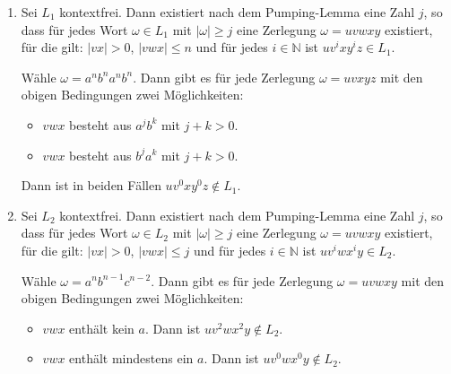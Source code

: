 \documentclass{bschlangaul-aufgabe}
\begin{document}
\begin{enumerate}


\item {}

\begin{bAntwort}
Sei $L_1$ kontextfrei. Dann existiert nach dem Pumping-Lemma eine Zahl
$j$, so dass für jedes Wort $\omega \in L_1$ mit $|\omega| \geq j$ eine
Zerlegung $\omega = uvwxy$ existiert, für die gilt: $|vx| > 0$, $|vwx|
\leq n$ und für jedes $i \in \mathbb{N}$ ist $u v^i x y^i z \in L_1$.

Wähle $\omega = a^n b^n a^n b^n$. Dann gibt es für jede Zerlegung
$\omega = uvxyz$ mit den obigen Bedingungen zwei Möglichkeiten:

\begin{itemize}
\item $vwx$ besteht aus $a^j b^k$ mit $j + k > 0$.

\item $vwx$ besteht aus $b^j a^k$ mit $j + k > 0$.
\end{itemize}
Dann ist in beiden Fällen $u v^0 x y^0 z \notin L_1$.
\end{bAntwort}


\item {}

\begin{bAntwort}
Sei $L_2$ kontextfrei. Dann existiert nach dem Pumping-Lemma eine Zahl
$j$, so dass für jedes Wort $\omega \in L_2$ mit $|\omega| \geq j$ eine
Zerlegung $\omega = uvwxy$ existiert, für die gilt: $|vx| > 0$, $|vwx|
\leq j$ und für jedes $i \in \mathbb{N}$ ist $u v^i w x^i y \in L_2$.

Wähle $\omega = a^n b^{n-1} c^{n-2}$.
Dann gibt es für jede Zerlegung $\omega = uvwxy$ mit den obigen
Bedingungen zwei Möglichkeiten:

\begin{itemize}
\item $vwx$ enthält kein $a$.
Dann ist $u v^2 w x^2 y \notin L_2$.

\item $vwx$ enthält mindestens ein $a$.
Dann ist $u v^0 w x^0 y \notin L_2$.
\end{itemize}
\end{bAntwort}
\end{enumerate}
\end{document}
